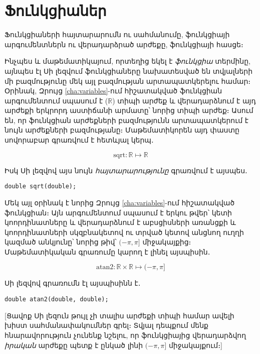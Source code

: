 \chapter{Ֆունկցիաներ}

\begin{epigraph}
Ֆունկցիաների հայտարարումն ու սահմանումը, ֆունկցիայի արգումենտներն
ու վերադարձրած արժեքը, ֆունկցիայի հասցե։
\end{epigraph}

Ինչպես և մաթեմատիկայում, որտեղից եկել է \emph{ֆունկցիա}
 տերմինը, այնպես էլ Սի լեզվում ֆունկցիաները
նախատեսված են տվյալների մի բազմությունը մեկ այլ բազմության
արտապատկերելու համար։ Օրինակ, Զրույց \ref{cha:variables}-ում
հիշատակված  ֆունկցիան արգումենտում սպասում
է  (\(\mathbb{R}\)) տիպի արժեք և վերադարձնում է այդ
արժեքի երկրորդ աստիճանի արմատը՝ նորից  տիպի արժեք։
Ասում են, որ  ֆունկցիան  արժեքների բազմությունն
արտապատկերում է նույն  արժեքների բազմությանը։ Մաթեմատիկորեն
այդ փաստը սովորաբար գրառվում է հետևյալ կերպ․

\[
\mathrm{sqrt}: \mathbb{R}\mapsto\mathbb{R}
\]

Իսկ Սի լեզվով այս նույն \emph{հայտարարությունը} գրառվում է այսպես․

\begin{Verbatim}
double sqrt(double);
\end{Verbatim}

Մեկ այլ օրինակ է նորից Զրույց \ref{cha:variables}-ում հիշատակված
 ֆունկցիան։ Այն արգումենտում սպասում է
երկու  թվեր՝ կետի կոորդինատները և վերադարձնում է աբսցիսների
առանցքի և կոորդինատների սկզբնակետով ու տրված կետով անցնող ուղղի կազմած
անկյունը՝ նորից  թիվ՝ \((−\pi, \pi]\) միջակայքից։
Մաթեմատիկական գրառումը կարող է լինել այսպիսին․

\[
\mathrm{atan2}: \mathbb{R}\times\mathbb{R}\mapsto(−\pi, \pi]
\]

Սի լեզվով գրառումն էլ այսպիսինն է․

\begin{Verbatim}
double atan2(double, double);
\end{Verbatim}

[Ցավոք Սի լեզուն թույլ չի տալիս արժեքի տիպի համար ավելի խիստ
սահմանափակումներ գրել։ Տվյալ դեպքում մենք հնարավորություն չունենք
նշելու, որ  ֆունկցիայից վերադարձվող \emph{իրական}
արժեքը պետք է ընկած լինի \((−\pi, \pi]\) միջակայքում։]

